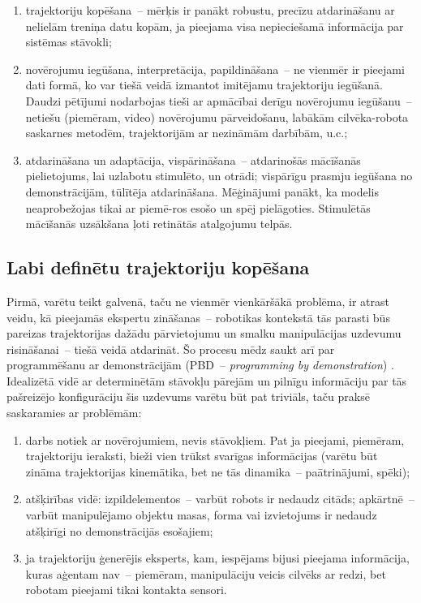 \documentclass[12pt, a4paper]{article}
\numberwithin{equation}{section} %
\begin{document}
\begin{enumerate}
    \item trajektoriju kopēšana~-- mērķis ir panākt robustu, precīzu atdarināšanu ar nelielām treniņa datu kopām, ja pieejama visa nepieciešamā informācija par sistēmas stāvokli;
    \item novērojumu iegūšana, interpretācija, papildināšana~-- ne vienmēr ir pieejami dati formā, ko var tiešā veidā izmantot imitējamu trajektoriju iegūšanā. Daudzi pētījumi nodarbojas tieši ar apmācībai derīgu novērojumu iegūšanu~-- netiešu (piemēram, video) novērojumu pārveidošanu, labākām cilvēka-robota saskarnes metodēm, trajektorijām ar nezināmām darbībām, u.c.;
    \item atdarināšana un adaptācija, vispārināšana~-- atdarinošās mācīšanās pielietojums, lai uzlabotu stimulēto, un otrādi; vispārīgu prasmju iegūšana no demonstrācijām, tūlītēja atdarināšana. Mēģinājumi panākt, ka modelis neaprobežojas tikai ar piemē-ros esošo un spēj pielāgoties. Stimulētās mācīšanās uzsākšana ļoti retinātās atalgojumu telpās.
\end{enumerate}

\subsection{Labi definētu trajektoriju kopēšana}

Pirmā, varētu teikt galvenā, taču ne vienmēr vienkāršākā problēma, ir atrast veidu, kā pieejamās ekspertu zināšanas~-- robotikas kontekstā tās parasti būs pareizas trajektorijas dažādu pārvietojumu un smalku manipulācijas uzdevumu risināšanai~-- tiešā veidā atdarināt. Šo procesu mēdz saukt arī par programmēšanu ar demonstrācijām (PBD~-- \textit{programming by demonstration}) \cite{muench1994robot,billard2008handbook}. Idealizētā vidē ar determinētām stāvokļu pārejām un pilnīgu informāciju par tās pašreizējo konfigurāciju šis uzdevums varētu būt pat triviāls, taču praksē saskaramies ar problēmām:

\begin{enumerate}
    \item darbs notiek ar novērojumiem, nevis stāvokļiem. Pat ja pieejami, piemēram, trajektoriju ieraksti, bieži vien trūkst svarīgas informācijas (varētu būt zināma trajektorijas kinemātika, bet ne tās dinamika~-- paātrinājumi, spēki);
    \item atšķirības vidē: izpildelementos~-- varbūt robots ir nedaudz citāds; apkārtnē~-- varbūt manipulējamo objektu masas, forma vai izvietojums ir nedaudz atšķirīgi no demonstrācijās esošajiem;
    \item ja trajektoriju ģenerējis eksperts, kam, iespējams bijusi pieejama informācija, kuras aģentam nav~-- piemēram, manipulāciju veicis cilvēks ar redzi, bet robotam pieejami tikai kontakta sensori.
\end{enumerate}
\end{document}
